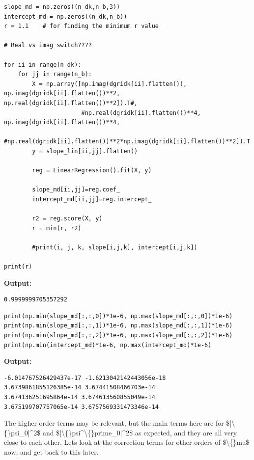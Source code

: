 \documentclass{article}
\begin{document}
\begin{lstlisting}
slope_md = np.zeros((n_dk,n_b,3))
intercept_md = np.zeros((n_dk,n_b))
r = 1.1    # for finding the minimum r value

# Real vs imag switch????

for ii in range(n_dk):
    for jj in range(n_b):
        X = np.array([np.imag(dgridk[ii].flatten()), np.imag(dgridk[ii].flatten())**2, np.real(dgridk[ii].flatten())**2]).T#, 
                      #np.real(dgridk[ii].flatten())**4, np.imag(dgridk[ii].flatten())**4, 
                      #np.real(dgridk[ii].flatten())**2*np.imag(dgridk[ii].flatten())**2]).T
        y = slope_lin[ii,jj].flatten()

        reg = LinearRegression().fit(X, y)

        slope_md[ii,jj]=reg.coef_
        intercept_md[ii,jj]=reg.intercept_

        r2 = reg.score(X, y)
        r = min(r, r2)

        #print(i, j, k, slope[i,j,k], intercept[i,j,k])

print(r)\end{lstlisting}

\textbf{Output:}\begin{verbatim}
0.9999999705357292

\end{verbatim}

\begin{lstlisting}
print(np.min(slope_md[:,:,0])*1e-6, np.max(slope_md[:,:,0])*1e-6)
print(np.min(slope_md[:,:,1])*1e-6, np.max(slope_md[:,:,1])*1e-6)
print(np.min(slope_md[:,:,2])*1e-6, np.max(slope_md[:,:,2])*1e-6)
print(np.min(intercept_md)*1e-6, np.max(intercept_md)*1e-6)\end{lstlisting}

\textbf{Output:}\begin{verbatim}
-6.014767526429437e-17 -1.6213042142443056e-18
3.6739861855126385e-14 3.67441508466703e-14
3.674136251695864e-14 3.674613560855049e-14
3.675199707757065e-14 3.6757569331473346e-14

\end{verbatim}

The higher order terms may be relevant, but the main terms here are for \$|\textbackslash\{\}psi\_0|\textasciicircum{}2\$ and \$|\textbackslash\{\}psi\textasciicircum{}\textbackslash\{\}prime\_0|\textasciicircum{}2\$ as expected, and they are all very close to each other. Lets look at the correction terms for other orders of \$\textbackslash\{\}mu\$ now, and get back to this later.
\end{document}
